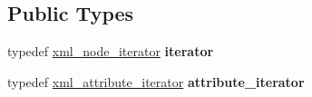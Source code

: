 \subsection*{Public Types}
\begin{DoxyCompactItemize}
\item 
\hypertarget{classpugi_1_1xml__node_ae053ea39add5a64de584f7a81212e388}{typedef \hyperlink{classpugi_1_1xml__node__iterator}{xml\+\_\+node\+\_\+iterator} {\bfseries iterator}}\label{classpugi_1_1xml__node_ae053ea39add5a64de584f7a81212e388}

\item 
\hypertarget{classpugi_1_1xml__node_a9084f97350ffc64af1eaf7c17c57f4ba}{typedef \hyperlink{classpugi_1_1xml__attribute__iterator}{xml\+\_\+attribute\+\_\+iterator} {\bfseries attribute\+\_\+iterator}}\label{classpugi_1_1xml__node_a9084f97350ffc64af1eaf7c17c57f4ba}

\end{DoxyCompactItemize}
